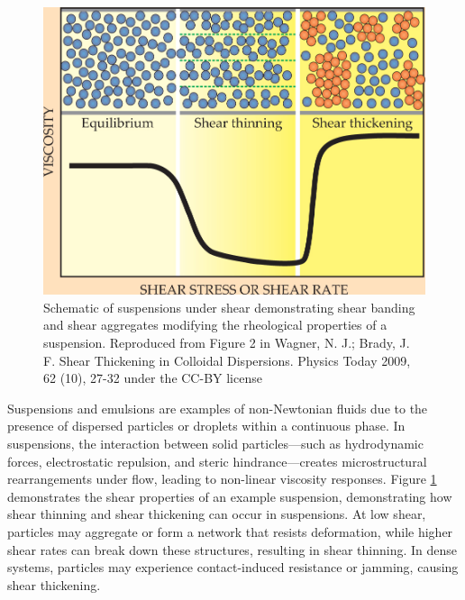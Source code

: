 \begin{figure}
    \centering
    \includegraphics[scale = 0.3]{../figures/literature_review/shear_suspensions.jpeg}
    \caption{Schematic of suspensions under shear demonstrating shear banding and shear aggregates modifying the rheological properties of a suspension. 
             Reproduced from Figure 2 in Wagner, N. J.; Brady, J. F. Shear Thickening in Colloidal Dispersions. Physics Today 2009, 62 (10), 27-32 under the CC-BY license}
    \label{fig:suspension_shear}
\end{figure}

Suspensions and emulsions are examples of non-Newtonian fluids due to the presence of dispersed particles or droplets within a continuous phase. 
\cite{brader_nonlinear_2010, besseling_three-dimensional_2007, xu_relation_2013}  
In suspensions, the interaction  between solid particles—such as hydrodynamic forces, electrostatic repulsion, and steric hindrance—creates microstructural rearrangements under flow, leading to 
non-linear viscosity 
responses. \cite{brader_nonlinear_2010, besseling_three-dimensional_2007} Figure \ref{fig:suspension_shear} demonstrates the shear properties of an example suspension, demonstrating how shear thinning
and shear thickening can occur in suspensions. At low shear, particles may aggregate or form a network that resists deformation, while higher shear rates can break 
down these structures, resulting in shear thinning. In dense systems, particles may experience contact-induced resistance or jamming, causing shear thickening. \cite{brader_nonlinear_2010}


